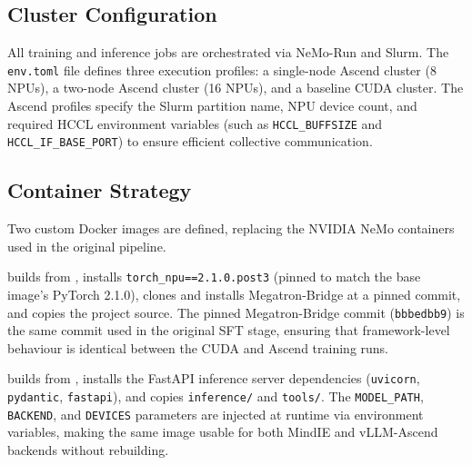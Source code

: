 \subsection{Cluster Configuration}
\label{sec:cluster-config}

All training and inference jobs are orchestrated via NeMo-Run and
Slurm. The \texttt{env.toml} file defines three execution profiles:
a single-node Ascend cluster (8 NPUs), a two-node Ascend cluster
(16 NPUs), and a baseline CUDA cluster. The Ascend profiles specify the
Slurm partition name, NPU device count, and required HCCL environment
variables (such as \texttt{HCCL\_BUFFSIZE} and \texttt{HCCL\_IF\_BASE\_PORT})
to ensure efficient collective communication.

\subsection{Container Strategy}
\label{sec:container-strategy}

Two custom Docker images are defined, replacing the NVIDIA NeMo
containers used in the original pipeline.

\textbf{} builds from
,
installs \texttt{torch\_npu==2.1.0.post3} (pinned to match the
base image's PyTorch 2.1.0), clones and installs Megatron-Bridge
at a pinned commit, and copies the project source. The pinned
Megatron-Bridge commit (\texttt{bbbedbb9}) is the same commit
used in the original SFT stage, ensuring that framework-level
behaviour is identical between the CUDA and Ascend training runs.

\textbf{} builds from
,
installs the FastAPI inference server dependencies (\texttt{uvicorn},
\texttt{pydantic}, \texttt{fastapi}), and copies \texttt{inference/}
and \texttt{tools/}. The \texttt{MODEL\_PATH}, \texttt{BACKEND},
and \texttt{DEVICES} parameters are injected at runtime via
environment variables, making the same image usable for both
MindIE and vLLM-Ascend backends without rebuilding.
